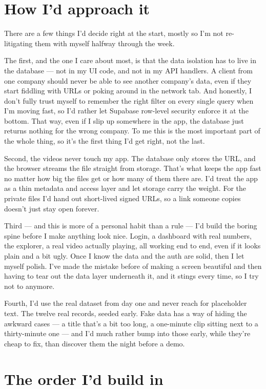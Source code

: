 \documentclass[a4paper,11pt]{article}
\begin{document}
\section{How I'd approach it}

There are a few things I'd decide right at the start, mostly so I'm not re-litigating them with myself halfway through the week.

The first, and the one I care about most, is that the data isolation has to live in the database --- not in my UI code, and not in my API handlers. A client from one company should never be able to see another company's data, even if they start fiddling with URLs or poking around in the network tab. And honestly, I don't fully trust myself to remember the right filter on every single query when I'm moving fast, so I'd rather let Supabase row-level security enforce it at the bottom. That way, even if I slip up somewhere in the app, the database just returns nothing for the wrong company. To me this is the most important part of the whole thing, so it's the first thing I'd get right, not the last.

Second, the videos never touch my app. The database only stores the URL, and the browser streams the file straight from storage. That's what keeps the app fast no matter how big the files get or how many of them there are. I'd treat the app as a thin metadata and access layer and let storage carry the weight. For the private files I'd hand out short-lived signed URLs, so a link someone copies doesn't just stay open forever.

Third --- and this is more of a personal habit than a rule --- I'd build the boring spine before I make anything look nice. Login, a dashboard with real numbers, the explorer, a real video actually playing, all working end to end, even if it looks plain and a bit ugly. Once I know the data and the auth are solid, then I let myself polish. I've made the mistake before of making a screen beautiful and then having to tear out the data layer underneath it, and it stings every time, so I try not to anymore.

Fourth, I'd use the real dataset from day one and never reach for placeholder text. The twelve real records, seeded early. Fake data has a way of hiding the awkward cases --- a title that's a bit too long, a one-minute clip sitting next to a thirty-minute one --- and I'd much rather bump into those early, while they're cheap to fix, than discover them the night before a demo.

\section{The order I'd build in}
\end{document}
